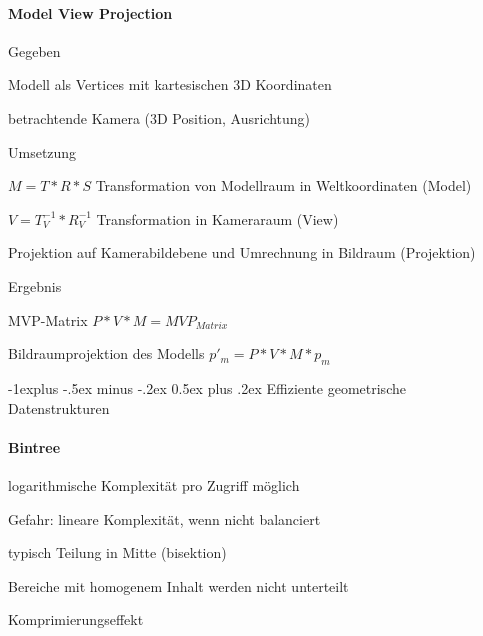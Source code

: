 \documentclass[landscape]{article}
\makeatletter
\renewcommand{\subsection}{\@startsection{subsection}{2}{0mm}%
                                {-1explus -.5ex minus -.2ex}%
                                {0.5ex plus .2ex}%
                                {\normalfont\normalsize\bfseries}}
\makeatother
\begin{document}
\begin{multicols}{3}
  \paragraph{Model View Projection}
  \begin{itemize*}
    \item Gegeben
    \begin{itemize*}
      \item Modell als Vertices mit kartesischen 3D Koordinaten
      \item betrachtende Kamera (3D Position, Ausrichtung)
    \end{itemize*}
    \item Umsetzung
    \begin{enumerate*}
      \item $M=T*R*S$ Transformation von Modellraum in Weltkoordinaten (Model)
      \item $V=T_V^{-1}*R_V^{-1}$ Transformation in Kameraraum (View)
      \item Projektion auf Kamerabildebene und Umrechnung in Bildraum (Projektion)
    \end{enumerate*}
    \item Ergebnis
    \begin{itemize*}
      \item MVP-Matrix $P*V*M=MVP_{Matrix}$
      \item Bildraumprojektion des Modells $p'_m=P*V*M*p_m$
    \end{itemize*}
  \end{itemize*}
  
  \subsection{Effiziente geometrische Datenstrukturen}
  \paragraph{Bintree}
  \begin{itemize*}
    \item logarithmische Komplexität pro Zugriff möglich
    \item Gefahr: lineare Komplexität, wenn nicht balanciert
    \item typisch Teilung in Mitte (bisektion)
    \item Bereiche mit homogenem Inhalt werden nicht unterteilt
    \item Komprimierungseffekt
  \end{itemize*}
  

\end{multicols}
\end{document}
